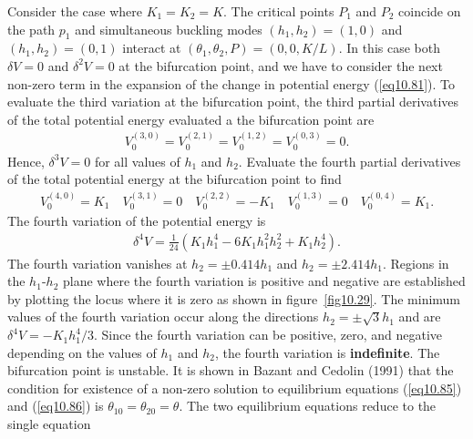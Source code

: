 \documentclass{AeroStructure-ERJohnson}
\begin{document}
Consider the case where $K_{1}=K_{2}=K$. The critical points $\textit{P}_1$ and $\textit{P}_2$ coincide on the path $p_1$ and simultaneous buckling modes $\left(h_{1}, h_{2}\right)=(1,0)$ and $\left(h_{1}, h_{2}\right)=(0,1)$ interact at $\left(\theta_{1}, \theta_{2}, P\right)=(0,0, K / L)$. In this case both $\delta V=0$ and $\delta^{2} V=0$ at the bifurcation point, and we have to consider the next non-zero term in the expansion of the change in potential energy (\ref{eq10.81}). To evaluate the third variation at the bifurcation point, the third partial derivatives of the total potential energy evaluated a the bifurcation point are
\begin{align}\label{eq10.95}
V_{0}^{(3,0)}=V_{0}^{(2,1)}=V_{0}^{(1,2)}=V_{0}^{(0,3)}=0.
\end{align}
Hence, $\delta^{3} V=0$ for all values of $h_1$ and $h_2$. Evaluate the fourth partial derivatives of the total potential energy at the bifurcation point to find
\begin{align}\label{eq10.96}
V_{0}^{(4,0)}=K_{1} \quad V_{0}^{(3,1)}=0 \quad V_{0}^{(2,2)}=-K_{1} \quad V_{0}^{(1,3)}=0 \quad V_{0}^{(0,4)}=K_{1}.
\end{align}
The fourth variation of the potential energy is
\begin{align}\label{eq10.97}
\delta^{4} V=\frac{1}{24}(K_{1} h_{1}^{4}-6 K_{1} h_{1}^{2} h_{2}^{2}+K_{1} h_{2}^{4}).
\end{align}
The fourth variation vanishes at $h_{2}=\pm 0.414 h_{1}$ and $h_{2}=\pm 2.414 h_{1}$. Regions in the $h_1$-$h_2$ plane where the fourth variation is positive and negative are established by plotting the locus where it is zero as shown in figure~\ref{fig10.29}. The minimum values of the fourth variation occur along the directions $h_{2}=\pm \sqrt{3} h_{1}$ and are $\delta^{4} V=-K_{1} h_{1}^{4} / 3$.\vadjust{\pagebreak} Since the fourth variation can be positive, zero, and negative depending on the values of $h_1$ and $h_2$, the fourth variation is \textbf{indefinite}. The bifurcation point is unstable. It is shown in Bazant and Cedolin (1991) that the condition for existence of a non-zero solution to equilibrium equations (\ref{eq10.85}) and (\ref{eq10.86}) is $\theta_{10}=\theta_{20}=\theta$. The two equilibrium equations reduce to the single equation
{\def\thefigure{10.29}
}
\end{document}
